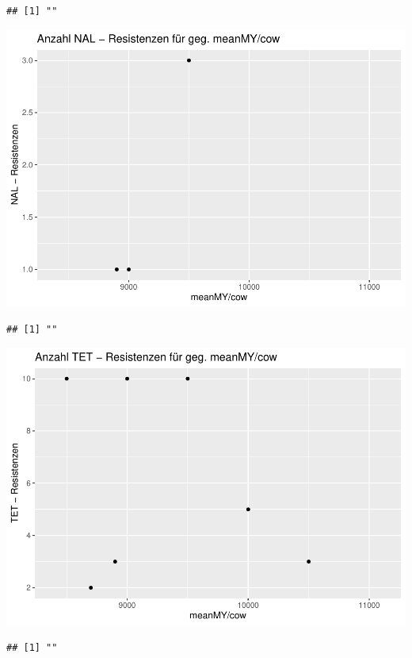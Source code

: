 \documentclass[
]{article}
\begin{document}
\begin{verbatim}
## [1] ""
\end{verbatim}

\includegraphics{NResistenzen_files/figure-latex/unnamed-chunk-6-7.pdf}

\begin{verbatim}
## [1] ""
\end{verbatim}

\includegraphics{NResistenzen_files/figure-latex/unnamed-chunk-6-8.pdf}

\begin{verbatim}
## [1] ""
\end{verbatim}
\end{document}
